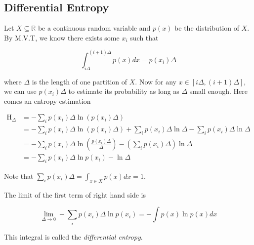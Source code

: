 \documentclass{article}
\begin{document}
        \subsection{Differential Entropy}

            Let $ X \subseteq \mathbb{R} $ be a continuous random variable and
            $ p(x) $ be the distribution of $ X $. By M.V.T, we know there
            exists some $ x_{i} $ such that

            \begin{equation*}
                 \int_{i \Delta}^{ (i+1) \Delta } p(x) dx = p(x_{i}) \Delta
            \end{equation*}

            where $ \Delta $ is the length of one partition of $ X $. Now for any
            $ x \in [i \Delta, (i + 1) \Delta] $, we can use $ p(x_i) \Delta $ to estimate
            its probability as long as $ \Delta $ small enough. Here comes an
            entropy estimation

            \begin{align*}
                \operatorname{H}_{\Delta}
                      &= - \sum_i p(x_i) \Delta \ln( p(x_i) \Delta) \\
                      &= - \sum_i p(x_i) \Delta \ln(p(x_i) \Delta) +
                             \sum_i p(x_i) \Delta \ln \Delta -
                                 \sum_i p(x_i) \Delta \ln \Delta    \\
                      &= - \sum_i p(x_i) \Delta \ln \left(
                                \frac{p(x_i) \Delta}{\Delta}
                            \right) - \left(
                                \sum_i p(x_i) \Delta
                            \right) \ln \Delta                      \\
                      &= - \sum_i p(x_i) \Delta \ln p(x_i) - \ln \Delta
            \end{align*}

            Note that $ \sum_i p(x_i) \Delta = \int_{x \in X} p(x) dx = 1 $.

            The limit of the first term of right hand side is

            \begin{equation*}
                 \lim_{\Delta \rightarrow 0} - \sum_i p(x_i) \Delta \ln p(x_i)
                 = - \int p(x) \ln p(x) dx
            \end{equation*}

            This integral is called the \textit{differential entropy}.
\end{document}
